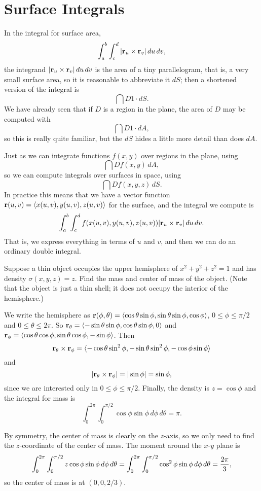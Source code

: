 \section{Surface Integrals}{}{}

In the integral for surface area,
$$\int_a^b\int_c^d |{\bf r}_u\times{\bf r}_v|\,du\,dv,$$
the integrand $|{\bf r}_u\times{\bf r}_v|\,du\,dv$
is the area of a tiny parallelogram, that is, a very small surface
area, so it is reasonable to abbreviate it $dS$; then a shortened
version of the integral is
$$\dint{D} 1\cdot dS.$$
We have already seen that if $D$ is a region in the plane, the area of
$D$ may be computed with 
$$\dint{D} 1\cdot dA,$$
so this is really quite familiar, but the $dS$ hides a little more
detail than does $dA$.

Just as we can integrate functions $f(x,y)$ over regions in the plane,
using
$$\dint{D} f(x,y)\, dA,$$
so we can compute integrals over surfaces in space, using
$$\dint{D} f(x,y,z)\, dS.$$
In practice this means that we have a vector function
${\bf r}(u,v)=\langle x(u,v),y(u,v),z(u,v)\rangle$ for the surface,
and the integral we compute is
$$\int_a^b\int_c^d f(x(u,v),y(u,v),z(u,v))|{\bf r}_u\times{\bf
  r}_v|\,du\,dv.$$ 
That is, we express everything in terms of $u$ and $v$, and then we
can do an ordinary double integral.

\begin{example} Suppose a thin object occupies the upper hemisphere of 
$x^2+y^2+z^2=1$ and has density $\sigma(x,y,z)=z$. Find the mass 
and center of mass of the
object. (Note that the object is just a thin shell; it does not occupy
the interior of the hemisphere.)

We write the hemisphere as ${\bf r}(\phi,\theta)=
\langle \cos\theta\sin\phi, \sin\theta\sin\phi, \cos\phi\rangle$,
$0\le\phi\le \pi/2$ and $0\le\theta\le 2\pi$. So
${\bf r}_\theta = \langle -\sin\theta\sin\phi, \cos\theta\sin\phi, 0\rangle$
and 
${\bf r}_\phi =\langle \cos\theta\cos\phi, \sin\theta\cos\phi, -\sin\phi\rangle$.
Then
$${\bf r}_\theta\times{\bf r}_\phi =
\langle -\cos\theta\sin^2\phi,-\sin\theta\sin^2\phi,-\cos\phi\sin\phi\rangle$$
and
$$ |{\bf r}_\theta\times{\bf r}_\phi| = |\sin\phi| = \sin\phi,$$
since we are interested only in $0\le\phi\le \pi/2$.
Finally, the density is $z=\cos\phi$ and the integral for mass is
$$\int_0^{2\pi}\int_0^{\pi/2} \cos\phi\sin\phi\,d\phi\,d\theta=\pi.$$

By symmetry, the center of mass is clearly on the $z$-axis, so we only
need to find the $z$-coordinate of the center of mass. The moment
around the $x$-$y$ plane is
$$\int_0^{2\pi}\int_0^{\pi/2} z\cos\phi\sin\phi\,d\phi\,d\theta
=\int_0^{2\pi}\int_0^{\pi/2} \cos^2\phi\sin\phi\,d\phi\,d\theta
={2\pi\over 3},$$
so the center of mass is at $(0,0,2/3)$.
\end{example}

